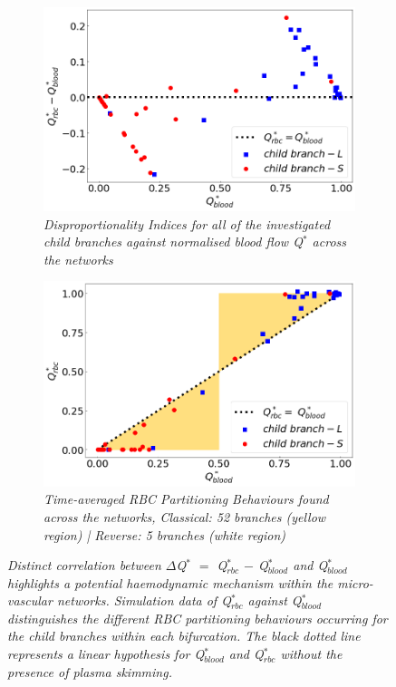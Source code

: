 \begin{figure}[H]
\centering
\begin{subfigure}{0.48 \textwidth}
    \includegraphics[width=1\textwidth]{images/DisproportionalityIndexQblood.png}
    \caption{\textit{Disproportionality Indices for all of the investigated child branches against normalised blood flow Q$^{*}$ across the networks} \label{DisproportionalityIndexQblood}}
\end{subfigure}
\hfill
\begin{subfigure}{0.48 \textwidth}
    \includegraphics[width=1\textwidth]{images/TimeAveragedRBCPartitioningBehaviours.png}
    \caption{\textit{Time-averaged RBC Partitioning Behaviours found across the networks, Classical: 52 branches (yellow region) | Reverse: 5 branches (white region)} \label{TimeAveragedRBCPartitioningBehaviours}}
\end{subfigure}
\caption{\textit{Distinct correlation between $\Delta$Q$^{*}$ $=$ Q$^{*}_{rbc}$ $-$ Q$^{*}_{blood}$ and Q$^{*}_{blood}$ highlights a potential haemodynamic mechanism within the micro-vascular networks. Simulation data of Q$^{*}_{rbc}$ against Q$^{*}_{blood}$ distinguishes the different RBC partitioning behaviours occurring for the child branches within each bifurcation. The black dotted line represents a linear hypothesis for Q$^{*}_{blood}$ and Q$^{*}_{rbc}$ without the presence of plasma skimming.} \label{PlasmaSkimmingEffects}}
\end{figure}

